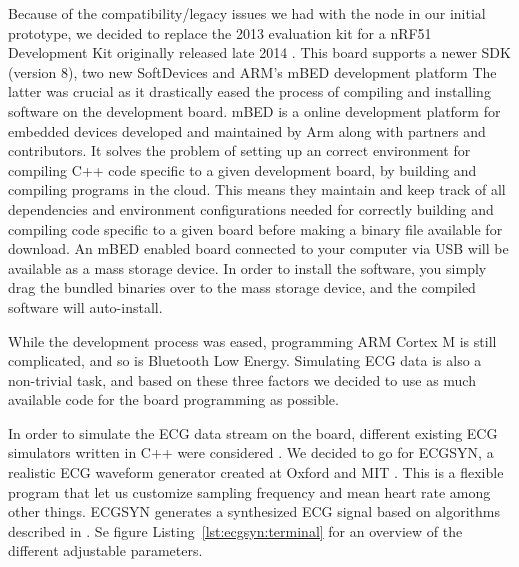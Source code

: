 Because of the compatibility/legacy issues we had with the node in our initial prototype, we decided to replace the 2013 evaluation kit for a nRF51 Development Kit originally released late 2014 \cite{newRef:53}. This board supports a newer SDK (version 8), two new SoftDevices and ARM's mBED development platform \cite{newRef:54} The latter was crucial as it drastically eased the process of compiling and installing software on the development board. mBED is a online development platform for embedded devices developed and maintained by Arm \cite{newRef:55} along with partners and contributors. It solves the problem of setting up an correct environment for compiling C++ code specific to a given development board, by building and compiling programs in the cloud. This means they maintain and keep track of all dependencies and environment configurations needed for correctly building and compiling code specific to a given board before making a binary file available for download. An mBED enabled board connected to your computer via USB will be available as a mass storage device. In order to install the software, you simply drag the bundled binaries over to the mass storage device, and the compiled software will auto-install. 

While the development process was eased, programming ARM Cortex M is still complicated, and so is Bluetooth Low Energy. Simulating ECG data is also a non-trivial task, and based on these three factors we decided to use as much available code for the board programming as possible.

In order to simulate the ECG data stream on the board, different existing ECG simulators written in C++ were considered \cite{newRef:56, newRef:56:1, newRef:56:2}. We decided to go for ECGSYN, a realistic ECG waveform generator created at Oxford and MIT \cite{newRef:56:2}. This is a flexible program that let us customize sampling frequency and mean heart rate among other things. ECGSYN generates a synthesized ECG signal based on algorithms described in \cite{newRef:58}. Se figure Listing~\ref{lst:ecgsyn:terminal} for an overview of the different adjustable parameters.

